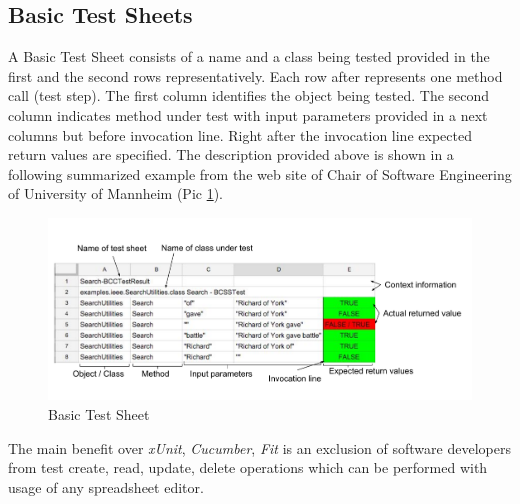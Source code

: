  \subsection{Basic Test Sheets}
A Basic Test Sheet consists of a name and a class being tested provided in the first and the second rows representatively.
Each row after represents one method call (test step).
The first column identifies the object being tested. The second column indicates method under test with input parameters provided in a next columns but before invocation line. 
Right after the invocation line expected return values are specified.
The description provided above is shown in a following summarized example from the web site of Chair of Software Engineering of University of Mannheim (Pic \ref{fig:BasictestSheet}).
  \begin{figure}[ht]
  	\label{fig:BasictestSheet}
    \centering
    \includegraphics[width=\textwidth]{grafiken/basic_test_sheet}
     \caption{Basic Test Sheet}
  \end{figure}

The main benefit over \textit{xUnit}, \textit{Cucumber}, \textit{Fit} is an exclusion of software developers from test create, read, update, delete operations which can be performed with usage of any spreadsheet editor.


